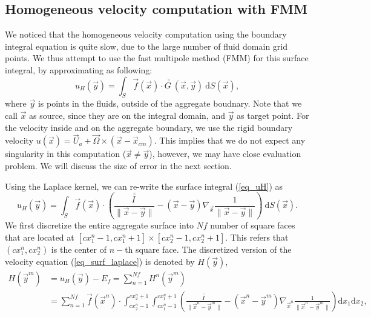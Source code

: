 \subsection{Homogeneous velocity computation with FMM}
We noticed that the homogeneous velocity computation using the boundary integral equation is quite slow, due to the large number of fluid domain grid points. We thus attempt to use the fast multipole method (FMM) for this surface integral, by approximating as following:
\begin{equation}
	u_H(\vec{y})  
	= \int_S \vec{f}(\vec{x}) \cdot \bar{\bar{G \ }}( \vec{x}, \vec{y}) \ \text{d} S(\vec{x}),
	\label{eq_uH}
\end{equation}
where $\vec{y}$ is points in the fluids, outside of the aggregate boudnary. Note that we call $\vec{x}$ as source, since they are on the integral domain, and $\vec{y}$ as target point. 
For the velocity inside and on the aggregate boundary, we use the rigid boundary velocity $u(\vec{x}) = \vec{U}_a + \vec{\Omega} \times \left(\vec{x} - \vec{x}_{cm} \right)$. This implies that we do not expect any singularity in this computation ($\vec{x} \neq \vec{y}$), however, we may have close evaluation problem. We will discuss the size of error in the next section. 
\par
Using the Laplace kernel, we can re-write the surface integral (\ref{eq_uH}) as
\begin{equation}
	u_H(\vec{y}) =
	\int_S 
	\vec{f}(\vec{x}) \cdot
  	\left(
  	\frac{\bar{\bar{I \ }}}{\|\vec{x} - \vec{y}\|}
  	- \left( \vec{x} - \vec{y} \right)
  	 \nabla_{\vec{x}}
  	\frac{1}{\|\vec{x} - \vec{y}\|}
  	\right)
	  \ \text{d} S(\vec{x}).
 \label{eq_surf_laplace}
\end{equation}
We first discretize the entire aggregate surface into $Nf$ number of square faces that are located at $[cx_1^n-1, cx^n_1+1] \times [cx^n_2-1, cx^n_2+1]$. This refers that $(cx^n_1, cx^n_2)$ is the center of $n-$th square face. The discretized version of the velocity equation (\ref{eq_surf_laplace}) is denoted by $H(\vec{y})$,
\begin{align}
	H(\vec{y}^m) & = u_H(\vec{y}) - E_f
	 = \sum_{n = 1}^{Nf} H^n(\vec{y}^m) 
	\nonumber \\
	& = \sum_{n = 1}^{Nf} 
	\vec{f}(\vec{x}^n) \cdot
	\int_{cx^n_2-1}^{cx^n_2+1} \int_{cx_1^n-1}^{cx_1^n+1}
  	\left(
  	\frac{\bar{\bar{I \ }}}{\|\vec{x}^n - \vec{y}^m\|}
  	- \left( \vec{x}^n - \vec{y}^m \right)
  	 \nabla_{\vec{x}^n}
  	\frac{1}{\|\vec{x}^n - \vec{y}^m\|}
  	\right)
	  \text{d} x_1  \text{d} x_2
	  ,
 \label{eq_surf_fmm_Nf}
\end{align}
